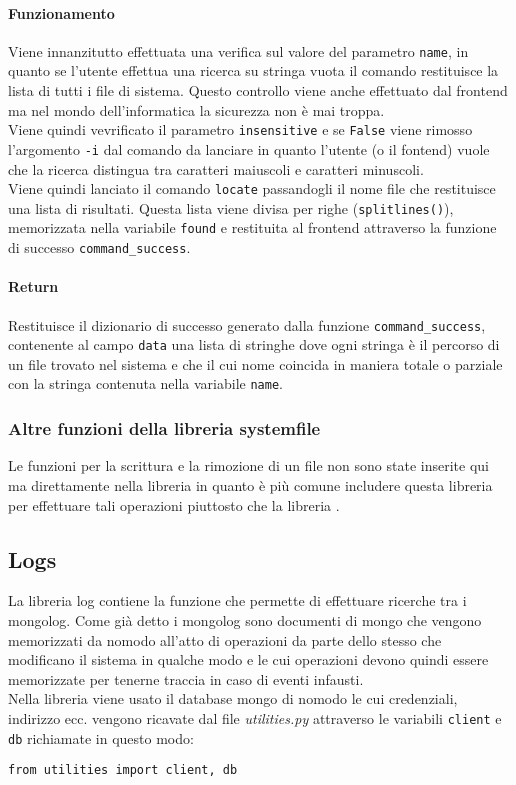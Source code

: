 \documentclass[11pt]{article}
\begin{document}
\paragraph{Funzionamento}
Viene innanzitutto effettuata una verifica sul valore del parametro \texttt{name}, in quanto se l'utente effettua
una ricerca su stringa vuota il comando restituisce la lista di tutti i file di sistema. Questo controllo viene
anche effettuato dal frontend ma nel mondo dell'informatica la sicurezza non è mai troppa.\\
Viene quindi vevrificato il parametro \texttt{insensitive} e se \texttt{False} viene rimosso l'argomento
\texttt{-i} dal comando da lanciare in quanto l'utente (o il fontend) vuole che la ricerca distingua tra
caratteri maiuscoli e caratteri minuscoli.\\
Viene quindi lanciato il comando \texttt{locate} passandogli il nome file che restituisce una lista di risultati.
Questa lista viene divisa per righe (\texttt{splitlines()}), memorizzata nella variabile \texttt{found} e restituita
al frontend attraverso la funzione di successo \texttt{command\_success}.
\paragraph{Return}
Restituisce il dizionario di successo generato dalla funzione \texttt{command\_success}, contenente al campo
\texttt{data} una lista di stringhe dove ogni stringa è il percorso di un file trovato nel sistema e che il cui
nome coincida in maniera totale o parziale con la stringa contenuta nella variabile \texttt{name}.

\subsubsection{Altre funzioni della libreria systemfile}\label{othersystemfilefunctions}
Le funzioni per la scrittura e la rimozione di un file non sono state inserite qui ma direttamente nella libreria
 in quanto è più comune includere questa libreria per effettuare tali operazioni piuttosto
che la libreria .


\subsection{Logs}\label{logs}
La libreria log contiene la funzione che permette di effettuare ricerche tra i mongolog. Come già detto i mongolog
sono documenti di mongo che vengono memorizzati da nomodo all'atto di operazioni da parte dello stesso che modificano
il sistema in qualche modo e le cui operazioni devono quindi essere memorizzate per tenerne traccia in caso di
eventi infausti.\\
Nella libreria viene usato il database mongo di nomodo le cui credenziali, indirizzo ecc. vengono ricavate dal file
\textit{utilities.py} attraverso le variabili \texttt{client} e \texttt{db} richiamate in questo modo:
\begin{lstlisting}
from utilities import client, db
\end{lstlisting}
\end{document}
